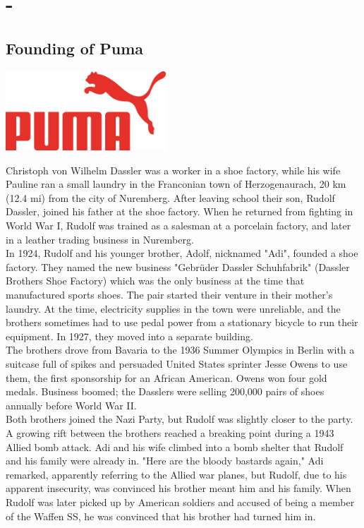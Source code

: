 \documentclass[11pt]{report}
\begin{document}
\section{-}
\subsection{Founding of Puma}
\vspace{2mm}\begin{center}\includegraphics[width=6cm]{./img/pumaLogo.jpg}\end{center}
Christoph von Wilhelm Dassler was a worker in a shoe factory, while his wife Pauline ran a small laundry in the Franconian town of Herzogenaurach, 20 km (12.4 mi) from the city of Nuremberg. After leaving school their son, Rudolf Dassler, joined his father at the shoe factory. When he returned from fighting in World War I, Rudolf was trained as a salesman at a porcelain factory, and later in a leather trading business in Nuremberg.\\
\indent In 1924, Rudolf and his younger brother, Adolf, nicknamed "Adi", founded a shoe factory. They named the new business "Gebrüder Dassler Schuhfabrik" (Dassler Brothers Shoe Factory) which was the only business at the time that manufactured sports shoes. The pair started their venture in their mother's laundry. At the time, electricity supplies in the town were unreliable, and the brothers sometimes had to use pedal power from a stationary bicycle to run their equipment. In 1927, they moved into a separate building.\\
\indent The brothers drove from Bavaria to the 1936 Summer Olympics in Berlin with a suitcase full of spikes and persuaded United States sprinter Jesse Owens to use them, the first sponsorship for an African American. Owens won four gold medals. Business boomed; the Dasslers were selling 200,000 pairs of shoes annually before World War II.\\
\indent Both brothers joined the Nazi Party, but Rudolf was slightly closer to the party. A growing rift between the brothers reached a breaking point during a 1943 Allied bomb attack. Adi and his wife climbed into a bomb shelter that Rudolf and his family were already in. "Here are the bloody bastards again," Adi remarked, apparently referring to the Allied war planes, but Rudolf, due to his apparent insecurity, was convinced his brother meant him and his family. When Rudolf was later picked up by American soldiers and accused of being a member of the Waffen SS, he was convinced that his brother had turned him in.
\end{document}
